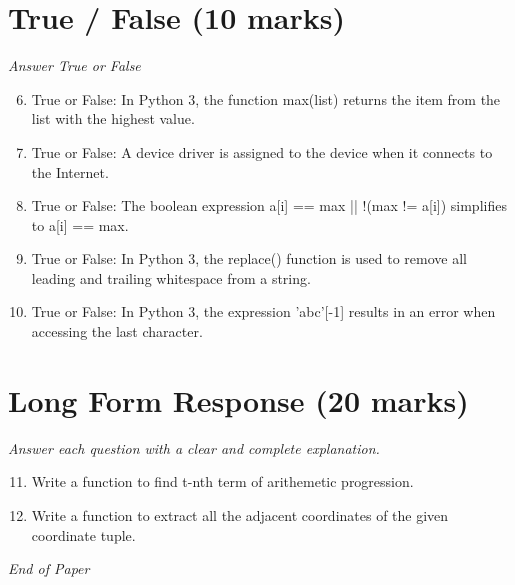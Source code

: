 \documentclass[12pt]{article}
\begin{document}
\section*{True / False (10 marks)}
\textit{Answer True or False}
\begin{enumerate}[label=\arabic*.]
\setcounter{enumi}{5}
\item True or False: In Python 3, the function max(list) returns the item from the list with the highest value.
\item True or False: A device driver is assigned to the device when it connects to the Internet.
\item True or False: The boolean expression a[i] == max || !(max != a[i]) simplifies to a[i] == max.
\item True or False: In Python 3, the replace() function is used to remove all leading and trailing whitespace from a string.
\item True or False: In Python 3, the expression 'abc'[-1] results in an error when accessing the last character.
\end{enumerate}

\section*{Long Form Response (20 marks)}
\textit{Answer each question with a clear and complete explanation.}
\begin{enumerate}[label=\arabic*.]
\setcounter{enumi}{10}
\item Write a function to find t-nth term of arithemetic progression.
\item Write a function to extract all the adjacent coordinates of the given coordinate tuple.
\end{enumerate}

\vfill
\noindent\textit{End of Paper}
\end{document}
